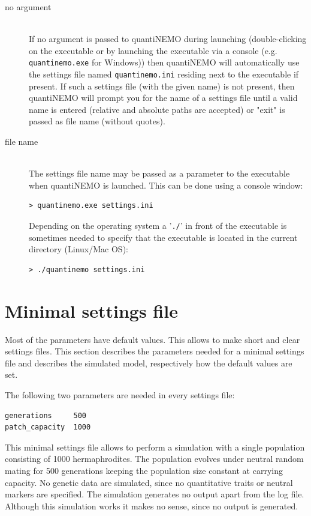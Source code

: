 \documentclass[letterpaper,12pt,oneside]{book}
\begin{document}
\begin{description}
\item[no argument]\hspace*{\fill}\\ 
If no argument is passed to quantiNEMO during launching (double-clicking on the executable or by launching the executable via a console (e.g. \texttt{quantinemo.exe} for Windows)) then quantiNEMO will automatically use the settings file named \texttt{quantinemo.ini} residing next to the executable if present. If such a settings file (with the given name) is not present, then quantiNEMO will prompt you for the name of a settings file until a valid name is entered (relative and absolute paths are accepted) or "exit" is passed as file name (without quotes).   

\item[file name]\hspace*{\fill}\\ 
The settings file name may be passed as a parameter to the executable when quantiNEMO is launched. This can be done using a console window:

\begin{lstlisting}[frame=single]
> quantinemo.exe settings.ini
\end{lstlisting}

Depending on the operating system a '\texttt{./}' in front of the executable is sometimes needed to specify that the executable is located in the current directory (Linux/Mac OS):
\begin{lstlisting}[frame=single]
> ./quantinemo settings.ini
\end{lstlisting}
\end{description}

\section{Minimal settings file}
Most of the parameters have default values. This allows to make short and clear settings files. This section describes the parameters needed for a minimal settings file and describes the simulated model, respectively how the default values are set.

The following two parameters are needed in every settings file:
\begin{lstlisting}[frame=single]
generations     500
patch_capacity  1000
\end{lstlisting}

This minimal settings file allows to perform a simulation with a single population consisting of 1000 hermaphrodites. The population evolves under neutral random mating for 500 generations keeping the population size constant at carrying capacity. No genetic data are simulated, since no quantitative traits or neutral markers are specified. The simulation generates no output apart from the log file. Although this simulation works it makes no sense, since no output is generated. 
\end{document}
